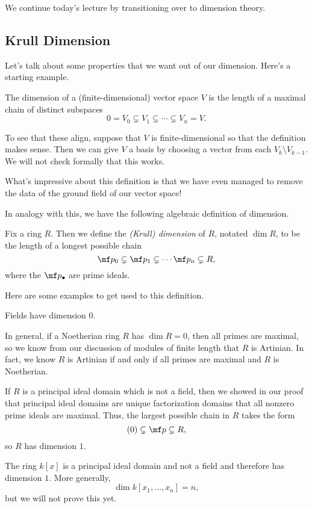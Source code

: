 
We continue today's lecture by transitioning over to dimension theory.

\subsection{Krull Dimension}
Let's talk about some properties that we want out of our dimension. Here's a starting example.
\begin{defi}
	The dimension of a (finite-dimensional) vector space $V$ is the length of a maximal chain of distinct subspaces
	\[0=V_0\subsetneq V_1\subsetneq\cdots\subsetneq V_n=V.\]
\end{defi}
\begin{remark}
	To see that these align, suppose that $V$ is finite-dimensional so that the definition makes sense. Then we can give $V$ a basis by choosing a vector from each $V_k\setminus V_{k-1}$. We will not check formally that this works.
\end{remark}
What's impressive about this definition is that we have even managed to remove the data of the ground field of our vector space!

In analogy with this, we have the following algebraic definition of dimension.
\begin{definition} \label{def:krulldim}
	Fix a ring $R$. Then we define the \textit{(Krull) dimension} of $R$, notated $\dim R$, to be the length of a longest possible chain
	\[\mf p_0\subsetneq\mf p_1\subsetneq\cdots\mf p_n\subsetneq R,\]
	where the $\mf p_\bullet$ are prime ideals.
\end{definition}
Here are some examples to get used to this definition.
\begin{example}
	Fields have dimension $0$.
\end{example}
\begin{example}
	In general, if a Noetherian ring $R$ has $\dim R=0$, then all primes are maximal, so we know from our discussion of modules of finite length that $R$ is Artinian. In fact, we know $R$ is Artinian if and only if all primes are maximal and $R$ is Noetherian.
\end{example}
\begin{example}
	If $R$ is a principal ideal domain which is not a field, then we showed in our proof that principal ideal domains are unique factorization domains that all nonzero prime ideals are maximal. Thus, the largest possible chain in $R$ takes the form
	\[(0)\subsetneq\mf p\subsetneq R,\]
	so $R$ has dimension $1$.
\end{example}
\begin{example}
	The ring $k[x]$ is a principal ideal domain and not a field and therefore has dimension $1$. More generally,
	\[\dim k[x_1,\ldots,x_n]=n,\]
	but we will not prove this yet.
\end{example}

